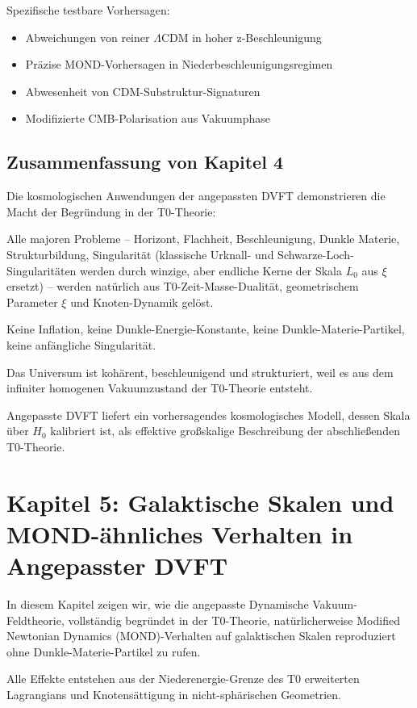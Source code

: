 	Spezifische testbare Vorhersagen:
	\begin{itemize}
		\item Abweichungen von reiner $\Lambda$CDM in hoher z-Beschleunigung
		\item Präzise MOND-Vorhersagen in Niederbeschleunigungsregimen
		\item Abwesenheit von CDM-Substruktur-Signaturen
		\item Modifizierte CMB-Polarisation aus Vakuumphase
	\end{itemize}
	
	\subsection{Zusammenfassung von Kapitel 4}
	
	Die kosmologischen Anwendungen der angepassten DVFT demonstrieren die Macht der Begründung in der T0-Theorie:
	
	Alle majoren Probleme – Horizont, Flachheit, Beschleunigung, Dunkle Materie, Strukturbildung, Singularität (klassische Urknall- und Schwarze-Loch-Singularitäten werden durch winzige, aber endliche Kerne der Skala $L_0$ aus $\xi$ ersetzt) – werden natürlich aus T0-Zeit-Masse-Dualität, geometrischem Parameter $\xi$ und Knoten-Dynamik gelöst.
	
	Keine Inflation, keine Dunkle-Energie-Konstante, keine Dunkle-Materie-Partikel, keine anfängliche Singularität.
	
	Das Universum ist kohärent, beschleunigend und strukturiert, weil es aus dem infiniter homogenen Vakuumzustand der T0-Theorie entsteht.
	
	Angepasste DVFT liefert ein vorhersagendes kosmologisches Modell, dessen Skala über $H_0$ kalibriert ist, als effektive großskalige Beschreibung der abschließenden T0-Theorie.
	
	\section{Kapitel 5: Galaktische Skalen und MOND-ähnliches Verhalten in Angepasster DVFT}
	
	In diesem Kapitel zeigen wir, wie die angepasste Dynamische Vakuum-Feldtheorie, vollständig begründet in der T0-Theorie, natürlicherweise Modified Newtonian Dynamics (MOND)-Verhalten auf galaktischen Skalen reproduziert ohne Dunkle-Materie-Partikel zu rufen.
	
	Alle Effekte entstehen aus der Niederenergie-Grenze des T0 erweiterten Lagrangians und Knotensättigung in nicht-sphärischen Geometrien.
	
